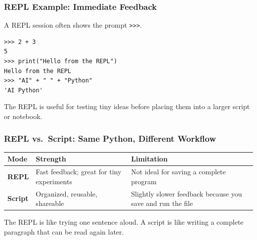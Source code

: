 \documentclass[aspectratio=169,10pt]{beamer}
\begin{document}
\begin{frame}[fragile]
\frametitle{REPL Example: Immediate Feedback}
\vspace{0.45cm}
A REPL session often shows the prompt \texttt{>>>}.
\begin{lstlisting}[style=termcode,basicstyle=\ttfamily\normalsize]
>>> 2 + 3
5
>>> print("Hello from the REPL")
Hello from the REPL
>>> "AI" + " " + "Python"
'AI Python'
\end{lstlisting}
\vspace{0.3cm}
\begin{tcolorbox}[lecturebox,title=What students should notice]
The REPL is useful for testing tiny ideas before placing them into a larger script or notebook.
\end{tcolorbox}
\end{frame}


\begin{frame}
\frametitle{REPL vs.\ Script: Same Python, Different Workflow}
\vspace{0.65cm}
\renewcommand{\arraystretch}{1.35}
\begin{tabularx}{\textwidth}{>{\bfseries}p{2.4cm}X X}
\toprule
Mode & Strength & Limitation \\
\midrule
REPL & Fast feedback; great for tiny experiments & Not ideal for saving a complete program \\
Script & Organized, reusable, shareable & Slightly slower feedback because you save and run the file \\
\bottomrule
\end{tabularx}
\vspace{0.55cm}
\begin{tcolorbox}[lecturebox,title=Teaching analogy]
The REPL is like trying one sentence aloud. A script is like writing a complete paragraph that can be read again later.
\end{tcolorbox}
\end{frame}
\end{document}
